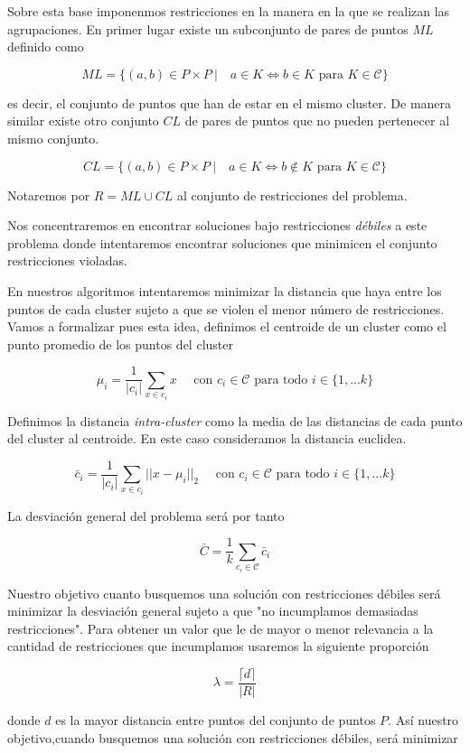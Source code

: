 \documentclass[11pt]{article}
\begin{document}
Sobre esta base imponenmos restricciones en la manera en la que se
realizan las agrupaciones. En primer lugar existe un subconjunto de
pares de puntos $ML$ definido como

\[ ML = \{(a,b) \in P\times P\ | \quad a \in K \iff b\in K \text{ para } K \in \mathcal{C}\}\]

es decir, el conjunto de puntos que han de estar en el mismo
cluster. De manera similar existe otro conjunto $CL$ de pares de
puntos que no pueden pertenecer al mismo conjunto.

\[ CL = \{(a,b) \in P\times P\ | \quad a \in K \iff b\notin K \text{ para } K \in \mathcal{C}\}\]

Notaremos por $R = ML \cup CL$ al conjunto de restricciones del problema.

Nos concentraremos en encontrar soluciones bajo restricciones \textit{débiles} a
este problema donde intentaremos encontrar soluciones que minimicen el conjunto
restricciones violadas.

En nuestros algoritmos intentaremos minimizar la distancia que haya
entre los puntos de cada cluster sujeto a que se violen el menor
número de restricciones. Vamos a formalizar pues esta idea,
definimos el centroide de un cluster como el punto promedio de los
puntos del cluster

\[
  \mu_i = \frac{1}{|c_i|}\sum_{x\in c_i}x \quad \text{ con } c_i \in \mathcal{C} \text{ para todo } i \in \{1,...k\}
\]

Definimos la distancia \textit{intra-cluster} como la media de las
distancias de cada punto del cluster al centroide. En este caso
consideramos la distancia euclidea.

\[
  \bar c_i = \frac{1}{|c_i|}\sum_{x\in c_i}||x-\mu_i||_2 \quad \text{ con } c_i \in \mathcal{C} \text{ para todo } i \in \{1,...k\}
\]

La desviación general del problema será por tanto

\[
  \bar C = \frac{1}{k}\sum_{c_i\in \mathcal{C}}\bar c_i
\]

Nuestro objetivo cuanto busquemos una solución con restricciones
débiles será minimizar la desviación general sujeto a que "no
incumplamos demasiadas restricciones". Para obtener un valor que le de
mayor o menor relevancia a la cantidad de restricciones que
incumplamos usaremos la siguiente proporción

\[
  \lambda = \frac{\lceil d \rceil}{|R|}
\]

donde $d$ es la mayor distancia entre puntos del conjunto de puntos
$P$.  Así nuestro objetivo,cuando busquemos una solución con
restricciones débiles, será minimizar
\end{document}
